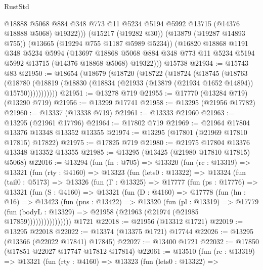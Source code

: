 \begin{lexlean}{RustStd}
\begin{coremodule}
            @18888
            @5068
            @884
            @348
            @773
            @11
            @5234
            @5194
            @5992
            @13715
            (@14376 @18888 @5068)
            @19322)))
      (@15217 (@19282 @30))
      (@13879 (@19287 @14893 @755))
      (@13665 (@19294 @755 @1187 @5989 @5234))
      (@16820
        @18868
        @1191
        @348
        @5234
        @5994
        (@13697
          @18868
          @5068
          @884
          @348
          @773
          @11
          @5234
          @5194
          @5992
          @13715
          (@14376 @18868 @5068)
          @19322)))
    @15738
@21934 := @15743 @83
@21950 := @18654
    (@18679
      (@18720
        (@18722
          (@18724
            (@18745
              (@18763
                (@18780
                  (@18819 (@18830 (@18834 (@21933 (@13879 (@21934 @1652 @14894)) @15750)))))))))))
@21951 := @13278 @719
@21955 := @17770 (@13284 @719) (@13290 @719)
@21956 := @13299 @17741
@21958 := @13295 (@21956 @17782)
@21960 := @13337 (@13338 @719)
@21961 := @13333 @21960
@21963 := @13295 (@21961 @17796)
@21964 := @17802 @719
@21969 := @21964 @17804 @13376 @13348 @13352 @13355
@21974 := @13295 (@17801 (@21969 @17810 @17815) @17822)
@21975 := @17825 @719
@21980 := @21975 @17804 @13376 @13348 @13352 @13355
@21985 := @13295 (@13425 (@21980 @17810 @17815) @5068)
@22016 := @13294
    (fun (fn : @705) =>
    @13320
      (fun (rc : @13319) =>
      @13321
        (fun (rty : @4160) =>
        @13323
          (fun (lets0 : @13322) =>
          @13324
            (fun (tail0 : @5173) =>
            @13326
              (fun (Γ : @13325) =>
              @17777
                (fun (ps : @17776) =>
                @13321
                  (fun (S : @4160) =>
                  @13321
                    (fun (D : @4160) =>
                    @17778
                      (fun (hn : @16) =>
                      @13423
                        (fun (pns : @13422) =>
                        @13320
                          (fun (pl : @13319) =>
                          @17779
                            (fun (bodyL : @13329) =>
                            @21958 (@21963 (@21974 (@21985 @17859))))))))))))))))
    @1721
@22018 := @21956 (@13312 @1721)
@22019 := @13295 @22018
@22022 := @13374 (@13375 @1721) @17744
@22026 := @13295 (@13366 (@22022 @17841) @17845)
@22027 := @13400 @1721
@22032 := @17850 (@17851 @22027 @17747 @17812 @17814)
@22061 := @13510
    (fun (rc : @13319) =>
    @13321
      (fun (rty : @4160) =>
      @13323
        (fun (lets0 : @13322) =>

\end{coremodule}
\end{lexlean}

